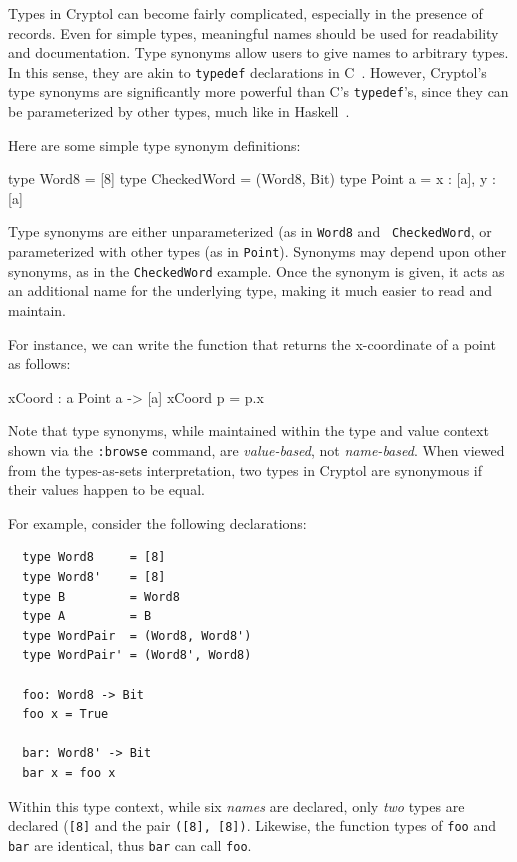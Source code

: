 

Types in Cryptol can become fairly complicated, especially in the
presence of records.  Even for simple types, meaningful names should
be used for readability and documentation.  Type synonyms allow users
to give names to arbitrary types.  In this sense, they are akin to
{\tt typedef} declarations in C~\cite{TheCProgrammingLanguage}.
However, Cryptol's type synonyms are significantly more powerful than
C's {\tt typedef}'s, since they can be parameterized by other types,
much like in Haskell~\cite{Has98}.


Here are some simple type synonym definitions:
\begin{code}
  type Word8       = [8]
  type CheckedWord = (Word8, Bit)
  type Point a     = {x : [a], y : [a]}
\end{code}


Type synonyms are either unparameterized (as in {\tt Word8} and {\tt
  CheckedWord}, or parameterized with other types (as in {\tt Point}).
Synonyms may depend upon other synonyms, as in the {\tt CheckedWord}
example.  Once the synonym is given, it acts as an additional name for
the underlying type, making it much easier to read and
maintain.  

For instance, we can write the function that returns the x-coordinate
of a point as follows:
\begin{code}
  xCoord : {a} Point a -> [a]
  xCoord p = p.x
\end{code}

Note that type synonyms, while maintained within the type and value
context shown via the \texttt{:browse} command, are
\emph{value-based}, not \emph{name-based}.  When viewed from the
types-as-sets interpretation, two types in Cryptol are synonymous if
their values happen to be equal.  

For example, consider the following declarations:
\begin{Verbatim}
  type Word8     = [8]
  type Word8'    = [8]
  type B         = Word8
  type A         = B
  type WordPair  = (Word8, Word8')
  type WordPair' = (Word8', Word8)

  foo: Word8 -> Bit
  foo x = True

  bar: Word8' -> Bit
  bar x = foo x
\end{Verbatim}
Within this type context, while six \emph{names} are declared, only
\emph{two} types are declared (\texttt{[8]} and the pair \texttt{([8],
[8])}.  Likewise, the function types of \texttt{foo} and \texttt{bar}
are identical, thus \texttt{bar} can call \texttt{foo}.

